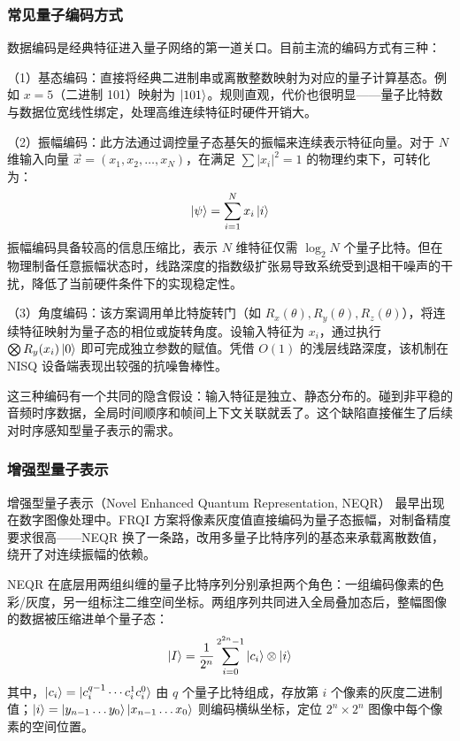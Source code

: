\subsubsection{常见量子编码方式}
数据编码是经典特征进入量子网络的第一道关口。目前主流的编码方式有三种：

（1）基态编码：直接将经典二进制串或离散整数映射为对应的量子计算基态。例如 $x = 5$（二进制 101）映射为 $\ket{101}$。规则直观，代价也很明显——量子比特数与数据位宽线性绑定，处理高维连续特征时硬件开销大。

（2）振幅编码：此方法通过调控量子态基矢的振幅来连续表示特征向量。对于 $N$ 维输入向量 $\vec{x} = (x_1, x_2, \dots, x_N)$，在满足 $\sum |x_i|^2 = 1$ 的物理约束下，可转化为：
\begin{equation}
	\ket{\psi} = \sum_{i=1}^{N} x_i \ket{i}
\end{equation}
振幅编码具备较高的信息压缩比，表示 $N$ 维特征仅需 $\log_2 N$ 个量子比特。但在物理制备任意振幅状态时，线路深度的指数级扩张易导致系统受到退相干噪声的干扰，降低了当前硬件条件下的实现稳定性。

（3）角度编码：该方案调用单比特旋转门（如 $R_x(\theta), R_y(\theta), R_z(\theta)$），将连续特征映射为量子态的相位或旋转角度。设输入特征为 $x_i$，通过执行 $\bigotimes R_y(x_i)\ket{0}$ 即可完成独立参数的赋值。凭借 $O(1)$ 的浅层线路深度，该机制在 NISQ 设备端表现出较强的抗噪鲁棒性。

这三种编码有一个共同的隐含假设：输入特征是独立、静态分布的。碰到非平稳的音频时序数据，全局时间顺序和帧间上下文关联就丢了。这个缺陷直接催生了后续对时序感知型量子表示的需求。

\subsubsection{增强型量子表示}
增强型量子表示（Novel Enhanced Quantum Representation, NEQR） 最早出现在数字图像处理中。FRQI 方案将像素灰度值直接编码为量子态振幅，对制备精度要求很高——NEQR 换了一条路，改用多量子比特序列的基态来承载离散数值，绕开了对连续振幅的依赖。

NEQR 在底层用两组纠缠的量子比特序列分别承担两个角色：一组编码像素的色彩/灰度，另一组标注二维空间坐标。两组序列共同进入全局叠加态后，整幅图像的数据被压缩进单个量子态：
\begin{equation}
	\ket{I} = \frac{1}{2^n} \sum_{i=0}^{2^{2 n}-1}\ket{c_i} \otimes\ket{i} 
\end{equation}
其中，$\ket{c_i} = \ket{c_i^{q-1} \cdots c_i^1 c_i^0}$ 由 $q$ 个量子比特组成，存放第 $i$ 个像素的灰度二进制值；$\ket{i} = \ket{y_{n-1}\dots y_0}\ket{x_{n-1}\dots x_0}$ 则编码横纵坐标，定位 $2^n \times 2^n$ 图像中每个像素的空间位置。

